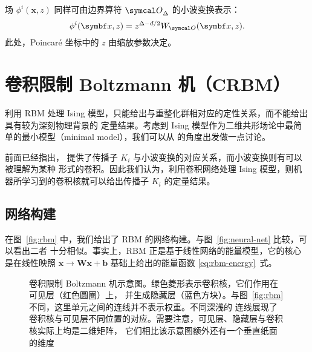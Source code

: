场 $\phi^i(\bm{x},z)$ 同样可由边界算符 $\opO_\Delta$ 的小波变换表示：
\begin{equation}
  \phi^i(\bm{x},z) = z^{\Delta-d/2} W_{\opO}(\bm{x},z).
\end{equation}
此处，Poincaré 坐标中的 $z$ 由缩放参数决定。

\section{卷积限制 Boltzmann 机（CRBM）}

利用 RBM 处理 Ising 模型，只能给出与重整化群相对应的定性关系，而不能给出具有较为深刻物理背景的
定量结果。考虑到 Ising 模型作为二维共形场论中最简单的最小模型（minimal model），我们可以从
\AdSCFT{} 的角度出发做一点讨论。

前面已经指出，\AdSCFT{} 提供了传播子 $K_i$ 与小波变换的对应关系，而小波变换则有可以被理解为某种
形式的卷积。因此我们认为，利用卷积网络处理 Ising 模型，则机器所学习到的卷积核就可以给出传播子
$K_i$ 的定量结果。

\subsection{网络构建}

在图~\ref{fig:rbm} 中，我们给出了 RBM 的网络构建。与图~\ref{fig:neural-net} 比较，可以看出二者
十分相似。事实上，RBM 正是基于线性网络的能量模型，它的核心是在线性映照
$\bm{x}\to\bm{W}\bm{x}+\bm{b}$ 基础上给出的能量函数 \eqref{eq:rbm-energy}~式。

\begin{figure}[htb]
  \centering
  \caption{卷积限制 Boltzmann 机示意图。绿色菱形表示卷积核，它们作用在可见层（红色圆圈）上，
    并生成隐藏层（蓝色方块）。与图~\ref{fig:rbm} 不同，这里单元之间的连线并不表示权重。不同深浅的
    连线展现了卷积核与可见层不同位置的对应。需要注意，可见层、隐藏层与卷积核实际上均是二维矩阵，
    它们相比该示意图额外还有一个垂直纸面的维度}
  \label{fig:crbm}
\end{figure}

